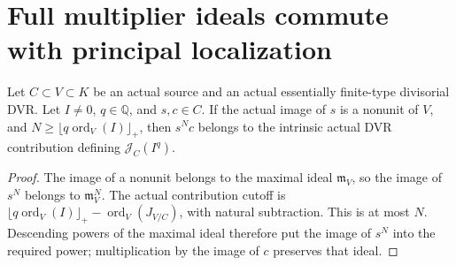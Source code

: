 \section{Full multiplier ideals commute with principal localization}

\begin{lemma}\label{lem:sc0-multiplier-nonunit-clearing}
\leanok
Let $C\subset V\subset K$ be an actual source and an actual essentially
finite-type divisorial DVR. Let $I\ne0$, $q\in\mathbb Q$, and $s,c\in C$.
If the actual image of $s$ is a nonunit of $V$, and
$N\ge\lfloor q\operatorname{ord}_V(I)\rfloor_+$, then $s^Nc$ belongs
to the intrinsic actual DVR contribution defining $\mathcal J_C(I^q)$.
\end{lemma}
\begin{proof}
The image of a nonunit belongs to the maximal ideal $\mathfrak m_V$,
so the image of $s^N$ belongs to $\mathfrak m_V^N$. The actual
contribution cutoff is
$\lfloor q\operatorname{ord}_V(I)\rfloor_+-\operatorname{ord}_V(J_{V/C})$,
with natural subtraction. This is at most $N$. Descending powers of
the maximal ideal therefore put the image of $s^N$ into the required
power; multiplication by the image of $c$ preserves that ideal.
\end{proof}

